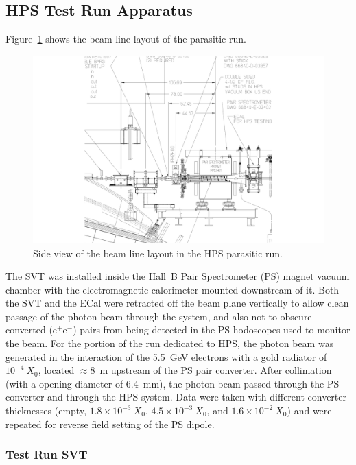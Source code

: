 \subsection{HPS Test Run Apparatus } 

Figure~\ref{fig:hpstest_layout} shows the beam line layout of the parasitic run.
\begin{figure}[ht]
    \includegraphics[width=\textwidth]{test2012/HPS_dimensions}
\caption{\small{Side view of the beam line layout in the HPS parasitic run.} }
\label{fig:hpstest_layout}
\end{figure}
The SVT was installed inside the Hall~B Pair Spectrometer (PS) magnet vacuum chamber with the 
electromagnetic calorimeter mounted downstream of it.
Both the SVT and the ECal were retracted off the beam plane vertically to allow clean passage of the photon 
beam through the system, and also not to obscure converted (e$^+$e$^-$) pairs from being detected in the 
PS hodoscopes used to monitor the beam. For the portion of the run dedicated to HPS, the 
photon beam was generated in the interaction of the 5.5~GeV electrons with a gold radiator of 
$10^{-4}~X_0$, located $\approx 8$~m upstream of the PS pair converter. After collimation 
(with a opening diameter of 6.4~mm), the photon beam passed through the PS converter and 
through the HPS system. Data were taken with different converter thicknesses 
(empty, $1.8\times 10^{-3}~X_0$, $4.5\times 10^{-3}~X_0$, and $1.6\times 10^{-2}~X_0$) and 
were repeated for reverse field setting of the PS dipole.


\subsubsection{Test Run SVT}

